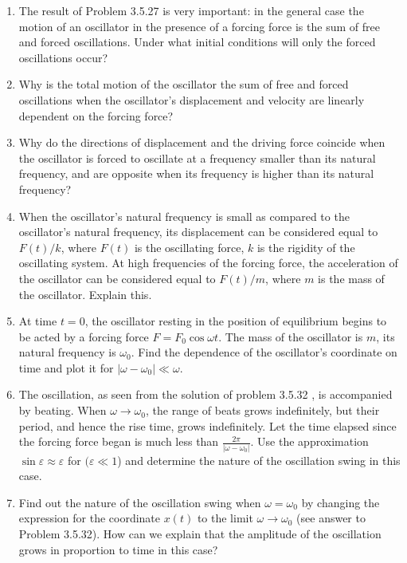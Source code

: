 \documentclass{article}
\begin{document}
\begin{enumerate}[label=3.5.\arabic*]
\item The result of Problem 3.5.27 is very important: in the general case the motion of an oscillator in the presence of a forcing force is the sum of free and forced oscillations. Under what initial conditions will only the forced oscillations occur?

\item Why is the total motion of the oscillator the sum of free and forced oscillations when the oscillator's displacement and velocity are linearly dependent on the forcing force?

\item Why do the directions of displacement and the driving force coincide when the oscillator is forced to oscillate at a frequency smaller than its natural frequency, and are opposite when its frequency is higher than its natural frequency?

\item When the oscillator's natural frequency is small as compared to the oscillator's natural frequency, its displacement can be considered equal to $F(t)/k$, where $F(t)$ is the oscillating force,  $k$ is the rigidity of the oscillating system. At high frequencies of the forcing force, the acceleration of the oscillator can be considered equal to $F(t)/m$, where $m$ is the mass of the oscillator. Explain this.

\item At time $t = 0$, the oscillator resting in the position of equilibrium begins to be acted by a forcing force $F = F_0 \cos{\omega t}$. The mass of the oscillator is $m$, its natural frequency is $\omega_0$. Find the dependence of the oscillator's coordinate on time and plot it for $| \omega - \omega_0| \ll \omega$. 

\item The oscillation, as seen from the solution of problem 3.5.32 , is accompanied by beating. When $\omega \to \omega_0$, the range of beats grows indefinitely, but their period, and hence the rise time, grows indefinitely. Let the time elapsed since the forcing force began is much less than $\frac{2 \pi }{|\omega - \omega_0|}$. Use the approximation $\sin{\varepsilon} \approx \varepsilon$ for $(\varepsilon \ll 1$) and determine the nature of the oscillation swing in this case.

\item Find out the nature of the oscillation swing when $\omega = \omega_0$ by changing the expression for the coordinate $x(t)$ to the limit $\omega \to \omega_0$ (see answer to Problem 3.5.32). How can we explain that the amplitude of the oscillation grows in proportion to time in this case?


\end{enumerate}
\end{document}
